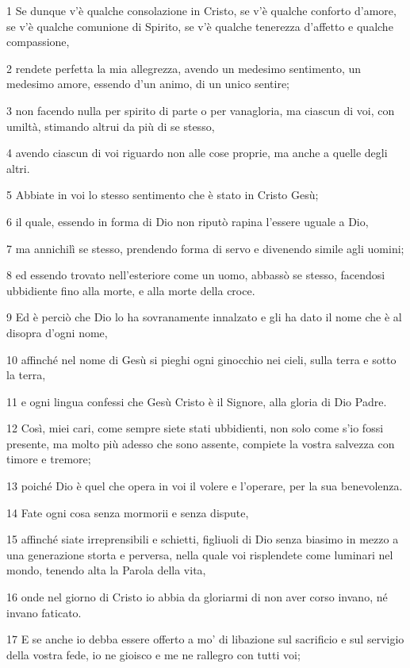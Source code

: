 \par 1 Se dunque v'è qualche consolazione in Cristo, se v'è qualche conforto d'amore, se v'è qualche comunione di Spirito, se v'è qualche tenerezza d'affetto e qualche compassione,
\par 2 rendete perfetta la mia allegrezza, avendo un medesimo sentimento, un medesimo amore, essendo d'un animo, di un unico sentire;
\par 3 non facendo nulla per spirito di parte o per vanagloria, ma ciascun di voi, con umiltà, stimando altrui da più di se stesso,
\par 4 avendo ciascun di voi riguardo non alle cose proprie, ma anche a quelle degli altri.
\par 5 Abbiate in voi lo stesso sentimento che è stato in Cristo Gesù;
\par 6 il quale, essendo in forma di Dio non riputò rapina l'essere uguale a Dio,
\par 7 ma annichilì se stesso, prendendo forma di servo e divenendo simile agli uomini;
\par 8 ed essendo trovato nell'esteriore come un uomo, abbassò se stesso, facendosi ubbidiente fino alla morte, e alla morte della croce.
\par 9 Ed è perciò che Dio lo ha sovranamente innalzato e gli ha dato il nome che è al disopra d'ogni nome,
\par 10 affinché nel nome di Gesù si pieghi ogni ginocchio nei cieli, sulla terra e sotto la terra,
\par 11 e ogni lingua confessi che Gesù Cristo è il Signore, alla gloria di Dio Padre.
\par 12 Così, miei cari, come sempre siete stati ubbidienti, non solo come s'io fossi presente, ma molto più adesso che sono assente, compiete la vostra salvezza con timore e tremore;
\par 13 poiché Dio è quel che opera in voi il volere e l'operare, per la sua benevolenza.
\par 14 Fate ogni cosa senza mormorii e senza dispute,
\par 15 affinché siate irreprensibili e schietti, figliuoli di Dio senza biasimo in mezzo a una generazione storta e perversa, nella quale voi risplendete come luminari nel mondo, tenendo alta la Parola della vita,
\par 16 onde nel giorno di Cristo io abbia da gloriarmi di non aver corso invano, né invano faticato.
\par 17 E se anche io debba essere offerto a mo' di libazione sul sacrificio e sul servigio della vostra fede, io ne gioisco e me ne rallegro con tutti voi;
